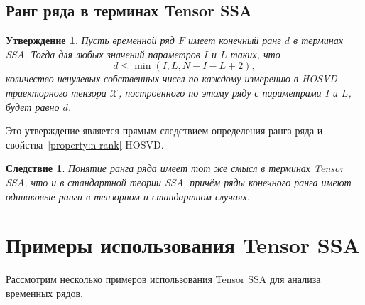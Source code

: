 \documentclass[specialist,
    substylefile = spbu_report.rtx,
    subf,href,colorlinks=true, 12pt]{disser}
\theoremstyle{plain}
\newtheorem{statement}{Утверждение}[section]
\newtheorem{corollary}{Следствие}[statement]
\theoremstyle{definition}
\theoremstyle{remark}
\begin{document}
    \subsection{Ранг ряда в терминах Tensor SSA}\label{subsec:tensor-ssa-rank}
    \begin{statement}
        Пусть временной ряд $F$ имеет конечный ранг $d$ в терминах \emph{SSA}\@.
        Тогда для любых значений параметров $I$ и $L$ таких, что
        \[
            d\leqslant\min(I, L, N-I-L+2),
        \]
        количество ненулевых собственных чисел по каждому измерению в \emph{HOSVD} траекторного тензора $\mathcal{X}$,
        построенного по этому ряду с параметрами $I$ и $L$, будет равно $d$.
    \end{statement}
    Это утверждение является прямым следствием определения ранга ряда и свойства~\ref{property:n-rank} HOSVD\@.

    \begin{corollary}
        Понятие ранга ряда имеет тот же смысл в терминах Tensor SSA, что и в стандартной теории SSA, причём ряды конечного ранга
        имеют одинаковые ранги в тензорном и стандартном случаях.
    \end{corollary}


    \section{Примеры использования Tensor SSA}\label{sec:tensor-ssa-examples}
    Рассмотрим несколько примеров использования Tensor SSA для анализа временных рядов.
\end{document}
